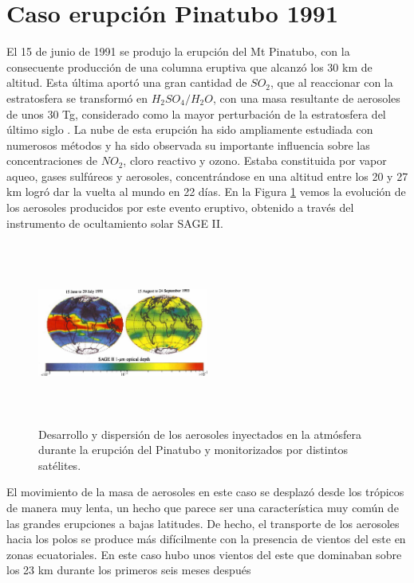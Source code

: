 \documentclass[a4apaper,twocolumn,10pt]{article}
\begin{document}
\section{Caso erupción Pinatubo 1991}
El 15 de junio de 1991 se produjo la erupci\'on del Mt Pinatubo, con la consecuente
producci\'on de una columna eruptiva que alcanz\'o los 30 km de altitud. Esta \'ultima aport\'o una gran cantidad de $SO_{2}$, que al reaccionar con la estratosfera se transform\'o en $H_{2}SO_{4}/H_{2}O$, con una
masa resultante de aerosoles de unos 30 Tg, considerado como la mayor perturbaci\'on de la estratosfera del \'ultimo siglo \cite{mccormick1995atmospheric}. La nube de esta erupci\'on ha sido ampliamente estudiada con numerosos m\'etodos y ha sido observada su importante influencia sobre las concentraciones de $NO_{2}$, cloro reactivo y ozono. Estaba constituida por vapor aqueo,
gases sulf\'ureos y aerosoles, concentr\'andose en una altitud entre los 20 y 27 km logr\'o dar la vuelta al mundo en 22 d\'ias. En la Figura \ref{fig:Figura2} vemos la evoluci\'on de los aerosoles producidos por este evento eruptivo, obtenido a trav\'es del instrumento de ocultamiento solar SAGE II.
\begin{figure}[t]
\begin{center}
  \includegraphics[width=0.5\textwidth,height=6cm]{Figura2}
  \end{center}
  \caption{Desarrollo y dispersi\'on de los aerosoles inyectados en la atm\'osfera durante la erupci\'on del Pinatubo y monitorizados por distintos sat\'elites.}
  \label{fig:Figura2}
\end{figure}
El movimiento de la masa de aerosoles en este caso se desplaz\'o desde los tr\'opicos de
manera muy lenta, un hecho que parece ser una caracter\'istica muy com\'un de las grandes
erupciones a bajas latitudes. De hecho, el transporte de los aerosoles hacia los polos se produce m\'as dif\'icilmente con la presencia de vientos del este en zonas ecuatoriales. En este caso hubo unos vientos del este que dominaban sobre los 23 km durante los primeros seis meses despu\'es
\end{document}
